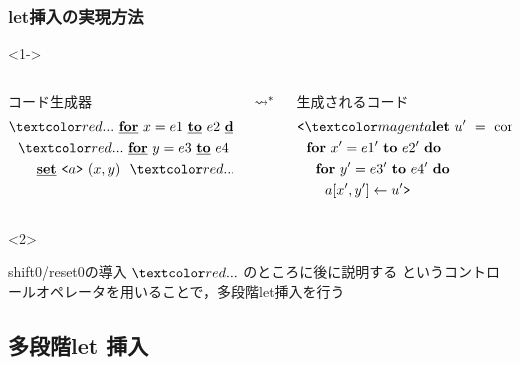 \begin{frame}
  \frametitle{let挿入の実現方法}

  \begin{visibleenv}<1->
    \begin{columns}
      \begin{column}{0.5\textwidth}%
        コード生成器
        \begin{align*}
          & \red{...}~ \cfordo{x = e1}{e2} \\
          & ~~\red{...}~ \cfordo{y = e3}{e4} \\
          & ~~~~~~\caryset{\code{a}}{(x,y)}~ \red{...}~ \text{comp calc}
        \end{align*}
      \end{column}
      $\leadsto^*$
      \begin{column}{0.5\textwidth}%
        生成されるコード
        \begin{align*}
          & \cbra \magenta{\Let ~u' ~= ~\text{comp calc}' ~\In} \\
          & ~~\fordo{x' = e1'}{e2'} \\
          & ~~~~\fordo{y' = e3'}{e4'} \\
          & ~~~~~~\aryset{a}{x',y'}{u'} \cket
        \end{align*}
      \end{column}
    \end{columns}
  \end{visibleenv}

  \begin{visibleenv}<2>
    \begin{exampleblock}{shift0/reset0の導入}
      $\red{...}$ のところに後に説明する  というコントロールオペレータを用いることで，多段階let挿入を行う
    \end{exampleblock}
  \end{visibleenv}
\end{frame}

\subsection{多段階let 挿入}

